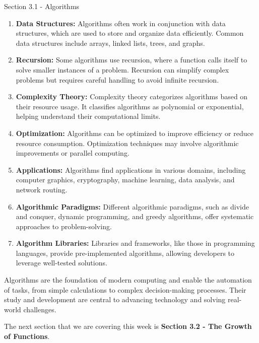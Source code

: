 \begin{notes}{Section 3.1 - Algorithms}
\begin{enumerate}
        \item \textbf{Data Structures:} Algorithms often work in conjunction with data structures, which are used to store and organize data efficiently. Common data structures include arrays, 
        linked lists, trees, and graphs.
    
        \item \textbf{Recursion:} Some algorithms use recursion, where a function calls itself to solve smaller instances of a problem. Recursion can simplify complex problems but requires 
        careful handling to avoid infinite recursion.
    
        \item \textbf{Complexity Theory:} Complexity theory categorizes algorithms based on their resource usage. It classifies algorithms as polynomial or exponential, helping understand their 
        computational limits.
    
        \item \textbf{Optimization:} Algorithms can be optimized to improve efficiency or reduce resource consumption. Optimization techniques may involve algorithmic improvements or parallel computing.
    
        \item \textbf{Applications:} Algorithms find applications in various domains, including computer graphics, cryptography, machine learning, data analysis, and network routing.
    
        \item \textbf{Algorithmic Paradigms:} Different algorithmic paradigms, such as divide and conquer, dynamic programming, and greedy algorithms, offer systematic approaches to problem-solving.
    
        \item \textbf{Algorithm Libraries:} Libraries and frameworks, like those in programming languages, provide pre-implemented algorithms, allowing developers to leverage well-tested solutions.
    
    \end{enumerate}
    
    Algorithms are the foundation of modern computing and enable the automation of tasks, from simple calculations to complex decision-making processes. Their study and development are central 
    to advancing technology and solving real-world challenges.    
\end{notes}

The next section that we are covering this week is \textbf{Section 3.2 - The Growth of Functions}.

